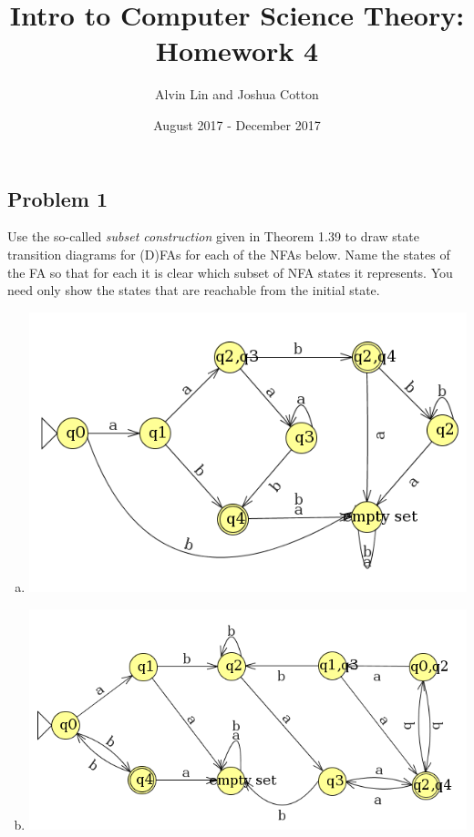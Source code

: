 \documentclass[letterpaper, 12pt]{math}
\title{Intro to Computer Science Theory: Homework 4}
\author{Alvin Lin and Joshua Cotton}
\date{August 2017 - December 2017}
\begin{document}
\maketitle

\subsection*{Problem 1}
Use the so-called \textit{subset construction} given in Theorem 1.39 to
draw state transition diagrams for (D)FAs for each of the NFAs below. Name the
states of the FA so that for each it is clear which subset of NFA states it
represents. You need only show the states that are reachable from the initial
state.
\begin{enumerate}[(a)]
  \item
  \begin{center}
    \includegraphics[width=15cm]{assets/hw_5_1.png}
  \end{center}
  \item
  \begin{center}
    \includegraphics[width=15cm]{assets/hw_5_2.png}
  \end{center}
\end{enumerate}
\end{document}
